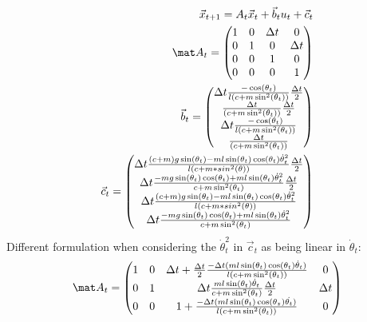 \begin{solution}[print=false]

\begin{align*}
\vec x_{t+1} = A_t \vec x_t + \vec b_t  u_t + \vec c_t\\
\mat A_t = \begin{pmatrix}
1 & 0 & \Delta t & 0\\
0 & 1 & 0  & \Delta t\\
0 & 0 & 1  & 0\\
0 & 0 & 0  & 1
\end{pmatrix}\\
\vec b_t = \begin{pmatrix}
\Delta t \frac{-\cos(\theta_t)}{l(c+m \sin^2(\theta_t))} \frac{\Delta t}{2}\\
\frac{\Delta t} {(c+m \sin^2(\theta_t))} \frac{\Delta t}{2}\\
\Delta t \frac{-\cos(\theta_t)}{l(c+m \sin^2(\theta_t))}\\
\frac{\Delta t} {(c+m \sin^2(\theta_t))}
\end{pmatrix}\\
\vec{c}_t = 
\begin{pmatrix}
\Delta t \frac{(c+m) g \sin(\theta_t)-m l \sin(\theta_t) \cos(\theta_t) \dot{\theta}_t^2}{l (c+m*sin^2(\theta))} \frac{\Delta t}{2}\\
\Delta t \frac{-m g \sin(\theta_t) \cos(\theta_t)+m l \sin(\theta_t) \dot{\theta}_t^2}{c+m \sin^2(\theta_t)} \frac{\Delta t}{2}\\
\Delta t \frac{(c+m) g \sin(\theta_t)-m l \sin(\theta_t) \cos(\theta_t) \dot{\theta}_t^2}{l (c+m*sin^2(\theta))}\\
\Delta t \frac{-m g \sin(\theta_t) \cos(\theta_t)+m l \sin(\theta_t) \dot{\theta}_t^2}{c+m \sin^2(\theta_t)}
\end{pmatrix}
\end{align*}
Different formulation when considering the $\dot{\theta}_t^2$ in $\vec{c}_t$ as being linear in $\dot{\theta}_t$:
\begin{align*}
\mat A_t = \begin{pmatrix}
1 & 0 & \Delta t + \frac{\Delta t}{2} \frac{- \Delta t (m l \sin(\theta_t) \cos(\theta_t) \dot{\theta}_t)}{l (c+m \sin^2(\theta_t))} & 0\\
0 & 1 & \Delta t \frac{m l \sin(\theta_t) \dot{\theta}_t}{c+m \sin^2(\theta_t)} \frac{\Delta t}{2} & \Delta t\\
0 & 0 & 1 + \frac{- \Delta t (m l \sin(\theta_t) \cos(\theta_z) \dot{\theta_t})}{l (c+m \sin^2(\theta_t))}  & 0\\

\end{pmatrix}
\end{align*}
\end{solution}
